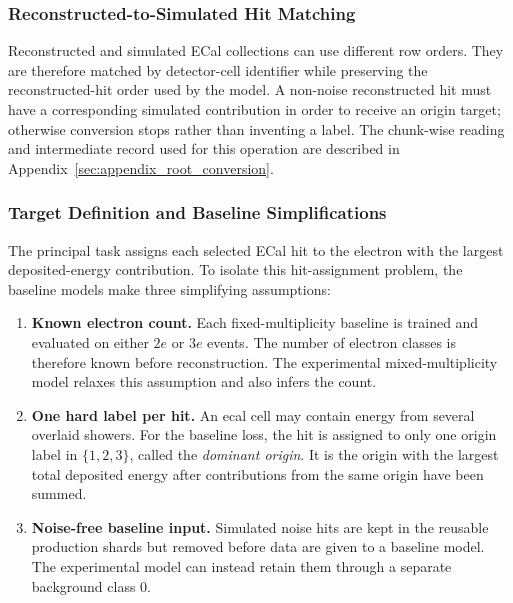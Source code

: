 \subsubsection{Reconstructed-to-Simulated Hit Matching}

Reconstructed and simulated ECal collections can use different row orders.
They are therefore matched by detector-cell identifier while preserving the
reconstructed-hit order used by the model. A non-noise reconstructed hit must
have a corresponding simulated contribution in order to receive an origin
target; otherwise conversion stops rather than inventing a label. The
chunk-wise reading and intermediate record used for this operation are
described in Appendix~\ref{sec:appendix_root_conversion}.

\subsubsection{Target Definition and Baseline Simplifications}
\label{sec:method_targets}

The principal task assigns each selected ECal hit to the electron with the
largest deposited-energy contribution. To isolate this hit-assignment problem,
the baseline models make three simplifying assumptions:

\begin{enumerate}
    \item \textbf{Known electron count.} Each fixed-multiplicity baseline is
    trained and evaluated on either \(2e\) or \(3e\) events. The number of
    electron classes is therefore known before reconstruction. The experimental
    mixed-multiplicity model relaxes this assumption and also infers the count.

    \item \textbf{One hard label per hit.} An \gls{ecal} cell may contain
    energy from several overlaid showers. For the baseline loss, the hit is
    assigned to only one origin label in \(\{1,2,3\}\), called the
    \textit{dominant origin}. It is the origin with the largest total
    deposited energy after contributions from the same origin have been summed.

    \item \textbf{Noise-free baseline input.} Simulated noise hits are kept in
    the reusable production shards but removed before data are given to a
    baseline model. The experimental model can instead retain them through a
    separate background class \(0\).
\end{enumerate}

